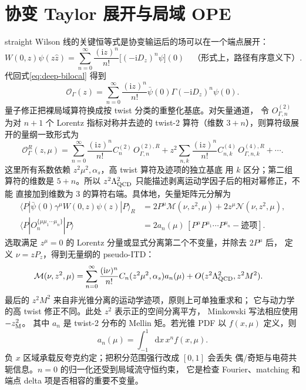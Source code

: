 \documentclass[UTF8,11pt,oneside]{ctexbook}
\newcommand{\dd}{\mathrm{d}}
\begin{document}
\section{协变 Taylor 展开与局域 OPE}

straight Wilson 线的关键恒等式是协变输运后的场可以在一个端点展开：
\begin{equation}
 W(0,z)\psi(z\hat z)
 =\sum_{n=0}^{\infty}\frac{(\mathrm{i}z)^n}{n!}
 \bigl[(-\mathrm{i}D_z)^n\psi\bigr](0)
 \quad\text{（形式上，路径有序意义下）}.
 \label{eq:deep-covariant-taylor}
\end{equation}
代回式\eqref{eq:deep-bilocal} 得到
\begin{equation}
 \mathcal O_\Gamma(z)
 =\sum_{n=0}^{\infty}\frac{(\mathrm{i}z)^n}{n!}
 \bar\psi(0)\Gamma(-\mathrm{i}D_z)^n\psi(0).
 \label{eq:deep-bilocal-local-expansion}
\end{equation}
量子修正把裸局域算符换成按 twist 分类的重整化基底。对矢量通道，
令 \(O_{\Gamma,n}^{(2)}\) 为对 \(n+1\) 个 Lorentz 指标对称并去迹的
twist-2 算符（维数 \(3+n\)），则算符级展开的量纲一致形式为
\begin{equation}
 \mathcal O_\Gamma^R(z,\mu)
 =\sum_{n=0}^{\infty}\frac{(\mathrm{i}z)^n}{n!}
 C_n^{(2)}\,O_{\Gamma,n}^{(2),R}
 +z^2\sum_{n,k}\frac{(\mathrm{i}z)^n}{n!}
 C_{n,k}^{(4)}\,O_{\Gamma,n,k}^{(4),R}+\cdots .
 \label{eq:deep-local-ope}
\end{equation}
这里所有系数依赖 \(z^2\mu^2,\alpha_s\)，高 twist 算符及迹项的独立基底
用 \(k\) 区分；第二组算符的维数是 \(5+n\)。所以
\(z^2\Lambda_{\rm QCD}^2\) 只能描述剥离运动学因子后的相对幂修正，不能
直接加到维数为 3 的算符右端。具体地，矢量矩阵元分解为
\begin{align}
 \langle P|\bar\psi(0)\gamma^\mu W(0,z)\psi(z)|P\rangle_R
 &=2P^\mu\mathcal M(\nu,z^2,\mu)+2z^\mu\mathcal N(\nu,z^2,\mu),\\
 \langle P|O_{n}^{\{\mu\mu_1\cdots\mu_n\}}|P\rangle
 &=2a_n(\mu)\,[P^\mu P^{\mu_1}\cdots P^{\mu_n}-\text{迹项}].
\end{align}
选取满足 \(z^\mu=0\) 的 Lorentz 分量或显式分离第二个不变量，并除去 \(2P^\mu\) 后，
定义 \(\nu=zP_z\)，得到无量纲的 pseudo-ITD：
\begin{align}
 \mathcal M(\nu,z^2,\mu)
 &=\sum_{n=0}^{\infty}\frac{(\mathrm{i}\nu)^n}{n!}
 C_n(z^2\mu^2,\alpha_s)a_n(\mu)
 +O(z^2\Lambda_{\rm QCD}^2,z^2M^2).
 \label{eq:deep-itd-moment-expansion}
\end{align}
最后的 \(z^2M^2\) 来自非光锥分离的运动学迹项，原则上可单独重求和；
它与动力学的高 twist 修正不同。此处 \(z^2\) 表示正的空间分离平方，
Minkowski 写法相应使用 \(-z_{\rm M}^2\)。
其中 \(a_n\) 是 twist-2 分布的 Mellin 矩。若光锥 PDF 以 \(f(x,\mu)\)
定义，则
\begin{equation}
 a_n(\mu)=\int_{-1}^{1}\dd x\,x^n f(x,\mu).
 \label{eq:deep-mellin-moment}
\end{equation}
负 \(x\) 区域承载反夸克约定；把积分范围强行改成 \([0,1]\) 会丢失
偶/奇矩与电荷共轭信息。\(n=0\) 的归一化还受到局域流守恒约束，
它是检查 Fourier、matching 和端点 delta 项是否相容的重要不变量。
\end{document}
